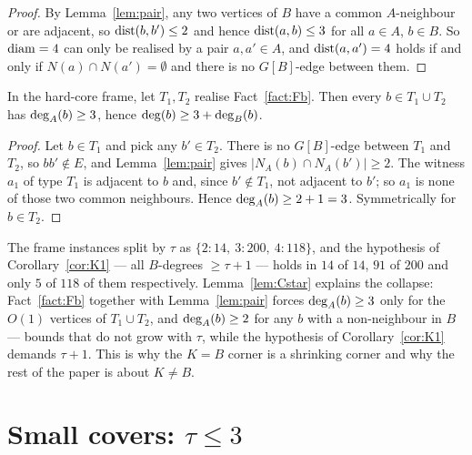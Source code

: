 \begin{proof}
By Lemma~\ref{lem:pair}, any two vertices of $B$ have a common $A$-neighbour or are
adjacent, so $\operatorname{dist}(b,b') \le 2$ and hence $\operatorname{dist}(a,b) \le 3$ for all $a \in A$,
$b \in B$. So $\operatorname{diam} = 4$ can only be realised by a pair $a, a' \in A$, and
$\operatorname{dist}(a,a') = 4$ holds if and only if $N(a) \cap N(a') = \emptyset$ and there is no
$G[B]$-edge between them.
\end{proof}

\begin{lemma}\label{lem:Cstar}
\Selem
In the hard-core frame, let $T_1, T_2$ realise Fact~\ref{fact:Fb}. Then every
$b \in T_1 \cup T_2$ has $\mathrm{deg}_A(b) \ge 3$, hence $\mathrm{deg}(b) \ge 3 + \mathrm{deg}_B(b)$.
\end{lemma}

\begin{proof}
Let $b \in T_1$ and pick any $b' \in T_2$. There is no $G[B]$-edge between $T_1$ and $T_2$,
so $bb' \notin E$, and Lemma~\ref{lem:pair} gives $|N_A(b) \cap N_A(b')| \ge 2$. The witness
$a_1$ of type $T_1$ is adjacent to $b$ and, since $b' \notin T_1$, not adjacent to $b'$; so
$a_1$ is none of those two common neighbours. Hence $\mathrm{deg}_A(b) \ge 2 + 1 = 3$. Symmetrically
for $b \in T_2$.
\end{proof}

\begin{remark}\label{rem:obstacle-tau}
The frame instances split by $\tau$ as $\{2 : 14,\ 3 : 200,\ 4 : 118\}$, and the hypothesis
of Corollary~\ref{cor:K1} --- all $B$-degrees $\ge \tau+1$ --- holds in $14$ of $14$, $91$
of $200$ and only $5$ of $118$ of them respectively. Lemma~\ref{lem:Cstar} explains the
collapse: Fact~\ref{fact:Fb} together with Lemma~\ref{lem:pair} forces $\mathrm{deg}_A(b) \ge 3$
only for the $O(1)$ vertices of $T_1 \cup T_2$, and $\mathrm{deg}_A(b) \ge 2$ for any $b$ with a
non-neighbour in $B$ --- bounds that do not grow with $\tau$, while the hypothesis of
Corollary~\ref{cor:K1} demands $\tau+1$. This is why the $K = B$ corner is a shrinking
corner and why the rest of the paper is about $K \ne B$.
\end{remark}

\section{Small covers: \texorpdfstring{$\tau \le 3$}{tau <= 3}}\label{sec:smalltau}

